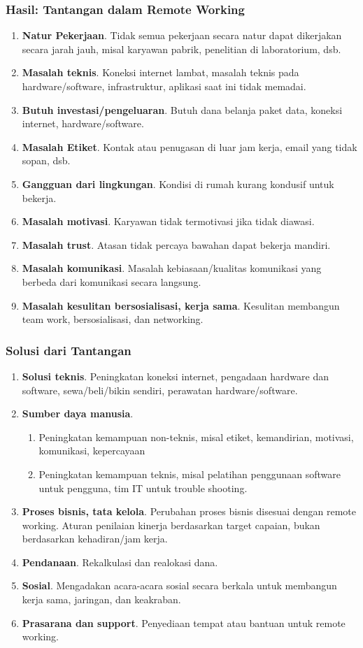 \documentclass[aspectratio=169]{beamer}
\begin{document}
	\begin{frame}
		\frametitle{Hasil: Tantangan dalam Remote Working}
		\begin{enumerate}
			\item \textbf{Natur Pekerjaan}. Tidak semua pekerjaan secara natur dapat dikerjakan secara jarah jauh, misal karyawan pabrik, penelitian di laboratorium, dsb.
			\item \textbf{Masalah teknis}. Koneksi internet lambat, masalah teknis pada hardware/software, infrastruktur, aplikasi saat ini tidak memadai.
			\item \textbf{Butuh investasi/pengeluaran}. Butuh dana belanja paket data, koneksi internet, hardware/software.
			\item \textbf{Masalah Etiket}. Kontak atau penugasan di luar jam kerja, email yang tidak sopan, dsb.
			\item \textbf{Gangguan dari lingkungan}. Kondisi di rumah kurang kondusif untuk bekerja.
			\item \textbf{Masalah motivasi}. Karyawan tidak termotivasi jika tidak diawasi.
			\item \textbf{Masalah trust}. Atasan tidak percaya bawahan dapat bekerja mandiri.
			\item \textbf{Masalah komunikasi}. Masalah  kebiasaan/kualitas komunikasi yang berbeda dari komunikasi secara langsung.
			\item \textbf{Masalah kesulitan bersosialisasi, kerja sama}. Kesulitan membangun team work, bersosialisasi, dan networking.
		\end{enumerate}
	\end{frame}
	
	\begin{frame}
		\frametitle{Solusi dari Tantangan}
		\begin{enumerate}
			\item \textbf{Solusi teknis}. Peningkatan koneksi internet, pengadaan hardware dan software, sewa/beli/bikin sendiri, perawatan hardware/software.
			\item \textbf{Sumber daya manusia}.
			\begin{enumerate}
				\item Peningkatan kemampuan non-teknis, misal etiket, kemandirian, motivasi, komunikasi, kepercayaan
				\item Peningkatan kemampuan teknis, misal pelatihan penggunaan software untuk pengguna, tim IT untuk trouble shooting.
			\end{enumerate}
			\item \textbf{Proses bisnis, tata kelola}. Perubahan proses bisnis disesuai dengan remote working. Aturan penilaian kinerja berdasarkan target capaian, bukan berdasarkan kehadiran/jam kerja.
			\item \textbf{Pendanaan}. Rekalkulasi dan realokasi dana. 
			\item \textbf{Sosial}. Mengadakan acara-acara sosial secara berkala untuk membangun kerja sama, jaringan, dan keakraban.
			\item \textbf{Prasarana dan support}. Penyediaan tempat atau bantuan untuk remote working.
		\end{enumerate}
	\end{frame}
	
\end{document}
